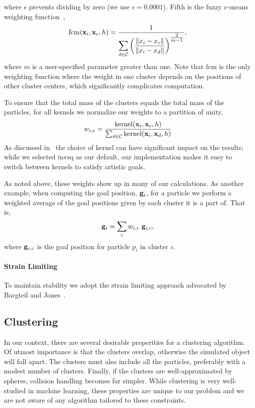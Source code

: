 \documentclass[review]{acmsiggraph}
\begin{document}
where $\epsilon$ prevents dividing by zero (we use $\epsilon = 0.0001$).
Fifth is the fuzzy c-means weighting function~\cite{Dunn:1973:AFR,Bezdek:1981:PRF},
\begin{equation}
\label{eq:fuzzycmeans}
\displaystyle \mathrm{fcm}(\mathit{\mathbf{x}}_i, \mathit{\mathbf{x}}_{c}, h) = \dfrac{1}{\displaystyle \sum_{d\in\mathcal{C}}\left(\dfrac{\|x_i - x_{c}\|}{\|x_i-x_{d}\|}\right)^{\tfrac{2}{m-1}}},
\end{equation}
where $m$ is a user-specified parameter greater than one.
Note that $\mathrm{fcm}$ is the only weighting function where the weight in one cluster depends on the positions of other cluster centers,
which significantly complicates computation.

To ensure that the total mass of the clusters equals the total mass of the particles, for all kernels we normalize our weights to a partition of unity,
\begin{equation}
\label{eq:weights}
w_{i,c} = \frac{\mathrm{kernel}(\mathit{\mathbf{x}}_i, \mathit{\mathbf{x}}_{c}, h)}{\sum_{d\in\mathcal{C}}\mathrm{kernel}(\mathit{\mathbf{x}}_i, \mathit{\mathbf{x}}_{d}, h)}
\end{equation}
As discussed in~ the choice of kernel can have significant impact on the results; while we selected
$\mathrm{invsq}$ as our default, our implementation makes it easy to switch between kernels to satisfy artistic goals.

As noted above, these weights show up in many of our calculations.  As another example,
when computing the goal position, $\mathit{\mathbf{g}}_i$, for a particle we perform a weighted
average of the goal positions given by each cluster it is a part of.  That is,
\begin{equation}
\mathit{\mathbf{g}}_i = \sum_c w_{i,c}~\mathit{\mathbf{g}}_{i,c},
\end{equation}
where $\mathit{\mathbf{g}}_{i,c}$ is the goal position for particle $p_i$ in cluster $c$.

\paragraph{Strain Limiting}
To maintain stability we adopt the strain limiting approach advocated by Bargteil and Jones~.

\subsection{Clustering}
In our context, there are several desirable properities for a clustering algorithm.  Of utmost importance is that the clusters overlap, 
otherwise the simulated object will fall apart.  The clusters must also include all the particles, preferably with a modest number of clusters.  
Finally, if the clusters are well-approximated by spheres, collision handling becomes far simpler.  While clustering is
very well-studied in machine learning, these properties are unique to our problem and we are not aware of any algorithm tailored to these
constraints.  
\end{document}
